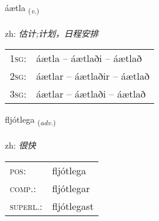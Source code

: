 \documentclass[frontgrid, backgrid]{flacards}\usepackage[]{graphicx}\usepackage[]{color}
\begin{document}
\renewcommand{\flhead}{\vskip5pt \fboxsep=0pt {\small\bfseries\footnotesize Sagnorð | 动词}}
\renewcommand{\fcfoot}{\vskip5pt \fboxsep=0pt \hspace{2pt}{\small\bfseries\footnotesize 2K}}

\renewcommand{\blhead}{\vskip5pt {\small\bfseries\footnotesize Sagnorð | 动词 }}
\renewcommand{\bcfoot}{\vskip5pt \hspace{2pt}{\small\bfseries\footnotesize 2K}}


{áætla \small{\textsubscript{(\textit{v.})}} \\[1ex] %
\textphonetic{[auːaihtla]} \\
zh: \emph{估计;计划，日程安排} \\  [2ex]
\renewcommand*{\arraystretch}{0.8}
\begin{tabular}{p{1cm}l}
\textsc{1sg}: & áætla -- áætlaði -- áætlað \\ 
\textsc{2sg}: & áætlar -- áætlaðir -- áætlað \\ 
\textsc{3sg}: & áætlar -- áætlaði -- áætlað \\ 
\end{tabular}
}

\renewcommand{\flhead}{\vskip5pt \fboxsep=0pt {\small\bfseries\footnotesize Atviksorð | 副词}}
\renewcommand{\fcfoot}{\vskip5pt \fboxsep=0pt \hspace{2pt}{\small\bfseries\footnotesize 2K}}

\renewcommand{\blhead}{\vskip5pt {\small\bfseries\footnotesize Atviksorð | 副词 }}
\renewcommand{\bcfoot}{\vskip5pt \hspace{2pt}{\small\bfseries\footnotesize 2K}}


{fljótlega \small{\textsubscript{(\textit{adv.})}} \\[1ex] %
\textphonetic{[fljoutlɛɣa]} \\
zh: \emph{很快} \\  [2ex]
\renewcommand*{\arraystretch}{0.8}
\begin{tabular}{ll}
\textsc{pos}: & fljótlega \\ 
\textsc{comp.}: & fljótlegar \\ 
\textsc{superl.}: & fljótlegast \\
\end{tabular}
}
\end{document}
